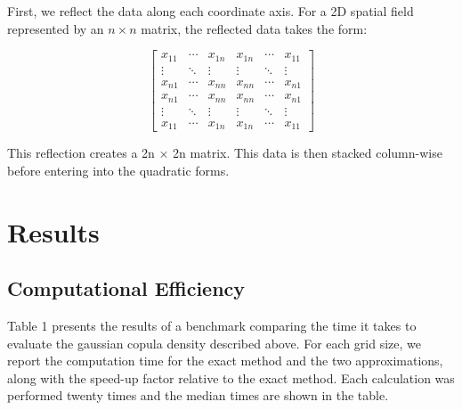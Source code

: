 \documentclass[journal=,manuscript=]{achemso}
\begin{document}
First, we reflect the data along each coordinate axis. For a 2D spatial
field represented by an \(n \times n\) matrix, the reflected data takes
the form:

\[
\begin{bmatrix}
x_{11} & \cdots & x_{1n} & x_{1n} & \cdots & x_{11} \\
\vdots & \ddots & \vdots & \vdots & \ddots & \vdots \\
x_{n1} & \cdots & x_{nn} & x_{nn} & \cdots & x_{n1} \\
x_{n1} & \cdots & x_{nn} & x_{nn} & \cdots & x_{n1} \\
\vdots & \ddots & \vdots & \vdots & \ddots & \vdots \\
x_{11} & \cdots & x_{1n} & x_{1n} & \cdots & x_{11}
\end{bmatrix}
\]

This reflection creates a 2n × 2n matrix. This data is then stacked
column-wise before entering into the quadratic forms.

\section{Results}\label{results}

\subsection{Computational Efficiency}\label{computational-efficiency}

Table 1 presents the results of a benchmark comparing the time it takes
to evaluate the gaussian copula density described above. For each grid
size, we report the computation time for the exact method and the two
approximations, along with the speed-up factor relative to the exact
method. Each calculation was performed twenty times and the median times
are shown in the table.
\end{document}
